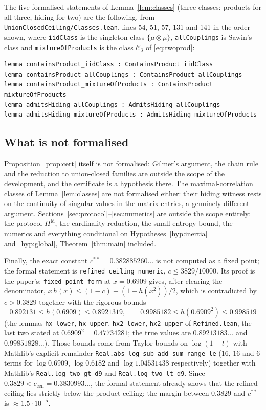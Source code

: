 \documentclass[11pt,a4paper]{article}
\theoremstyle{definition}
\theoremstyle{remark}
\newcommand{\cC}{\mathcal{C}}
\newcommand{\ent}{h}
\newcommand{\id}{\mathrm{id}}
\begin{document}
The five formalised statements of Lemma~\ref{lem:classes} (three classes: products for all three, hiding for two) are the following, from
\texttt{UnionClosedCeiling/\allowbreak Classes.lean}, lines 54, 51, 57, 131 and 141 in the order
shown, where \texttt{iidClass} is the singleton class
$\{\mu\otimes\mu\}$, \texttt{allCouplings} is Sawin's class and \texttt{mixtureOfProducts}
is the class $\cC_3$ of \eqref{eq:twoprod}:

\begin{Verbatim}[fontsize=\footnotesize,formatcom=\leanmono,samepage=false]
lemma containsProduct_iidClass : ContainsProduct iidClass
lemma containsProduct_allCouplings : ContainsProduct allCouplings
lemma containsProduct_mixtureOfProducts : ContainsProduct mixtureOfProducts
lemma admitsHiding_allCouplings : AdmitsHiding allCouplings
lemma admitsHiding_mixtureOfProducts : AdmitsHiding mixtureOfProducts
\end{Verbatim}

\subsection{What is not formalised}\label{app:lean:gaps}
Proposition~\ref{prop:cert} itself is not formalised: Gilmer's argument, the chain rule and
the reduction to union-closed families are outside the scope of the development, and the
certificate is a hypothesis there. The maximal-correlation classes of Lemma~\ref{lem:classes}
are not formalised either: their hiding witness rests on the continuity of singular values in
the matrix entries, a genuinely different argument. Sections~\ref{sec:protocol}--\ref{sec:numerics}
are outside the scope entirely: the protocol $\Pi^{\id}$, the cardinality reduction, the
small-entropy bound, the numerics and everything conditional on
Hypotheses~\ref{hyp:inertia} and~\ref{hyp:global}, Theorem~\ref{thm:main} included.

Finally, the exact constant $c^{**}=0.382885260\ldots$ is not computed as a fixed point; the
formal statement is \texttt{refined\_ceiling\_numeric}, $c\le3829/10000$. Its proof is the
paper's: \texttt{fixed\_point\_form} at $x=0.6909$ gives, after clearing the denominator,
$x\,\ent(x)\le(1-c)-(1-\ent(x^2))/2$, which is contradicted by $c>0.3829$ together with the
rigorous bounds
\[0.892131\le\ent(0.6909)\le0.8921319,\qquad 0.9985182\le\ent(0.6909^2)\le0.998519\]
(the lemmas \texttt{hx\_lower}, \texttt{hx\_upper}, \texttt{hx2\_lower},
\texttt{hx2\_upper} of \texttt{Refined.lean}, the last two stated at
$0.6909^2=0.47734281$; the true values are $0.89213183\ldots$ and $0.99851828\ldots$). Those
bounds come from Taylor bounds on $\log(1-t)$ with Mathlib's explicit remainder
\texttt{Real.abs\_log\_sub\_add\_sum\_range\_le} ($16$, $16$ and $6$ terms for
$\log0.6909$, $\log0.6182$ and $\log1.04531438$ respectively) together with Mathlib's
\texttt{Real.log\_two\_gt\_d9} and \texttt{Real.log\_two\_lt\_d9}. Since
$0.3829<c_{\mathrm{ceil}}=0.3830993\ldots$, the formal statement already shows that the
refined ceiling lies strictly below the product ceiling; the margin between $0.3829$ and
$c^{**}$ is $\approx1.5\cdot10^{-5}$.
\end{document}

